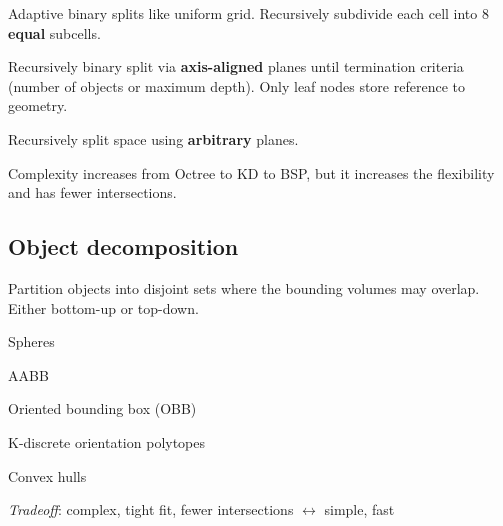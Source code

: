 \begin{definition}[Octree]
  Adaptive binary splits like uniform grid. Recursively subdivide each cell into 8 \textbf{equal} subcells.
\end{definition}

\begin{definition}[KD-Tree]
  Recursively binary split via \textbf{axis-aligned} planes until termination criteria (number of objects or maximum depth). Only leaf nodes store reference to geometry.
\end{definition}

\begin{definition}
  Recursively split space using \textbf{arbitrary} planes.
\end{definition}

\begin{theorem}
  Complexity increases from Octree to KD to BSP, but it increases the flexibility and has fewer intersections.
\end{theorem}

\subsection{Object decomposition}
Partition objects into disjoint sets where the bounding volumes may overlap.
Either bottom-up or top-down.

\begin{definition}
  \begin{itemize*}
    \item Spheres
    \item AABB
    \item Oriented bounding box (OBB)
    \item K-discrete orientation polytopes
    \item Convex hulls
  \end{itemize*}

  \textit{Tradeoff}: complex, tight fit, fewer intersections \(\leftrightarrow\) simple, fast
\end{definition}